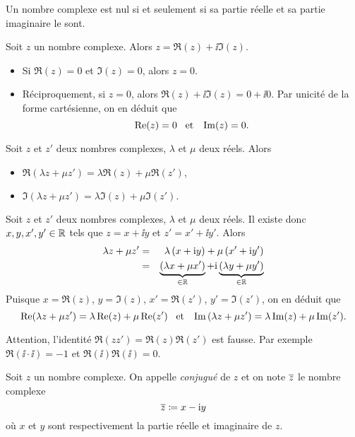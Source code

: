 \documentclass{magnolia}
\begin{document}
\begin{proposition}[utile=-3]
Un nombre complexe est nul si et seulement si sa partie réelle et sa partie imaginaire le sont.
\end{proposition}

\begin{preuve}
Soit $z$ un nombre complexe. Alors $z=\Re(z)+\ii \Im(z)$. 
\begin{itemize}
\item Si $\Re(z)=0$ et $\Im(z)=0$, alors $z=0$.
\item Réciproquement, si $z=0$, alors $\Re(z)+\ii \Im(z)=0+\ii 0$. Par unicité de la forme cartésienne, on en déduit que
  \[\mathop{\rm Re}(z)=0 \quad\!\text{et}\quad\! \mathop{\rm Im}(z)=0.\]
\end{itemize}
\end{preuve}

\begin{proposition}[utile=-3]
Soit $z$ et $z'$ deux nombres complexes, $\lambda$ et $\mu$ deux réels. Alors
\begin{itemize}
\item $\Re(\lambda z+\mu z')=\lambda\Re(z)+\mu\Re(z'),$
\item $\Im(\lambda z+\mu z')=\lambda\Im(z)+\mu\Im(z').$
\end{itemize}
\end{proposition}

\begin{preuve}
Soit $z$ et $z'$ deux nombres complexes, $\lambda$ et $\mu$ deux réels.
Il existe donc $x,y,x',y'\in\mathbb{R}$ tels que $z=x+\ii y$ et $z'=x'+\ii y'$. Alors
\begin{eqnarray*}
\lambda z+\mu z'
&=& \lambda\left(x+{\rm i} y\right)+\mu\left(x'+{\rm i} y'\right)\\
&=& \underbrace{\left(\lambda x+\mu x'\right)}_{\in\mathbb{R}}+{\rm i}
    \underbrace{\left(\lambda y+\mu y'\right)}_{\in\mathbb{R}}
\end{eqnarray*}
Puisque $x=\Re(z)$, $y=\Im(z)$, $x'=\Re(z')$, $y'=\Im(z')$, on en déduit que
\[\mathop{\rm Re}(\lambda z+\mu z')=\lambda\mathop{\rm Re}(z)+\mu\mathop{\rm Re}(z') \quad\!\text{et}\quad\!
  \mathop{\rm Im}\left(\lambda z+\mu z'\right)=\lambda\mathop{\rm Im}(z)+\mu\mathop{\rm Im}(z').\]
\end{preuve}

\begin{remarqueUnique}
\remarque Attention, l'identité $\Re(z z')=\Re(z)\Re(z')$ est fausse.
  Par exemple $\Re(\ii\cdot \ii)=-1$ et $\Re(\ii)\Re(\ii)=0$.
\end{remarqueUnique}

\begin{definition}[utile=-3]
  Soit $z$ un nombre complexe. On appelle \emph{conjugué} de $z$ et on note
  $\overline{z}$ le nombre complexe
  $$\overline{z}\coloneqq x-{\rm i} y$$
  où $x$ et $y$ sont respectivement la partie réelle et imaginaire de $z$.
\end{definition}
\end{document}
